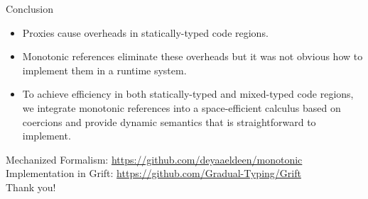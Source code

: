 \documentclass[12pt,dvipsnames]{beamer}
\begin{document}
\begin{frame}{Conclusion}
  \begin{itemize}
  \item Proxies cause overheads in statically-typed code regions.
  \item Monotonic references eliminate these overheads but it was not
    obvious how to implement them in a runtime system.
  \item To achieve efficiency in both statically-typed and mixed-typed
    code regions, we integrate monotonic references into a
    space-efficient calculus based on coercions and provide dynamic
    semantics that is straightforward to implement.
  \end{itemize}
  \vspace{1cm}
  \centering
  Mechanized Formalism: \url{https://github.com/deyaaeldeen/monotonic}
  Implementation in Grift: \url{https://github.com/Gradual-Typing/Grift}
  \\
  \vspace{1cm}
  \centering
  \Huge Thank you!
\end{frame}
\end{document}
